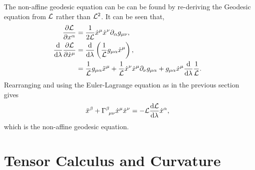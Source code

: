 The non-affine geodesic equation can be can be found by re-deriving the Geodesic equation from $\mathcal{L}$ rather than $\mathcal{L}^2$. It can be seen that,
\begin{align}
\frac{\partial{\mathcal{L}}}{\partial x^\alpha} &= \frac{1}{2\mathcal{L}} \dot{x}^\mu \dot{x}^\nu \partial_\alpha g_{\mu\nu},\\
\frac{\dd}{\dd \lambda}\frac{\partial \mathcal{L}}{\partial \dot{x}^\mu}&=\frac{\dd}{\dd \lambda} \left( \frac{1}{\mathcal{L}}g_{\mu\alpha}\dot{x}^\mu\right),\\
&= \frac{1}{\mathcal{L}}g_{\mu\alpha}\ddot{x}^\mu +  \frac{1}{\mathcal{L}}\dot{x}^\nu\dot{x}^\mu\partial_\nu g_{\mu\alpha} + g_{\mu\alpha}\dot{x}^\mu \frac{\dd}{\dd \lambda} \frac{1}{\mathcal{L}}.
\end{align}
Rearranging and using the Euler-Lagrange equation as in the previous section gives
\begin{equation}
\ddot{x}^\beta + \Gamma^\beta_{\,\,\,\mu\nu}\dot{x}^\mu\dot{x}^\nu=-\mathcal{L} \frac{\dd \mathcal{L}}{\dd \lambda} \dot{x}^\alpha,
\end{equation}
which is the non-affine geodesic equation.









\newpage
\section{Tensor Calculus and Curvature}


